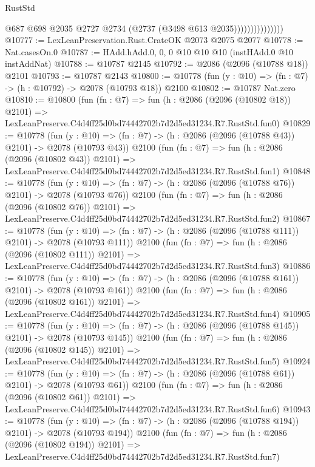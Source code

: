 \begin{lexlean}{RustStd}
\begin{coremodule}
                              @687
                              @698
                              @2035
                              @2727
                              @2734
                              (@2737 (@3498 @613 @2035)))))))))))))))
@10777 := LexLeanPreservation.Rust.CrateOK @2073 @2075 @2077
@10778 := Nat.casesOn.{0}
@10787 := HAdd.hAdd.{0, 0, 0} @10 @10 @10 (instHAdd.{0} @10 instAddNat)
@10788 := @10787 @2145
@10792 := @2086 (@2096 (@10788 @18)) @2101
@10793 := @10787 @2143
@10800 := @10778 (fun (y : @10) => (fn : @7) -> (h : @10792) -> @2078 (@10793 @18)) @2100
@10802 := @10787 Nat.zero
@10810 := @10800
    (fun (fn : @7) =>
    fun (h : @2086 (@2096 (@10802 @18)) @2101) =>
    LexLeanPreserve.C4d4ff25d0bd74442702b7d2d5ed31234.R7.RustStd.fun0)
@10829 := @10778
    (fun (y : @10) => (fn : @7) -> (h : @2086 (@2096 (@10788 @43)) @2101) -> @2078 (@10793 @43))
    @2100
    (fun (fn : @7) =>
    fun (h : @2086 (@2096 (@10802 @43)) @2101) =>
    LexLeanPreserve.C4d4ff25d0bd74442702b7d2d5ed31234.R7.RustStd.fun1)
@10848 := @10778
    (fun (y : @10) => (fn : @7) -> (h : @2086 (@2096 (@10788 @76)) @2101) -> @2078 (@10793 @76))
    @2100
    (fun (fn : @7) =>
    fun (h : @2086 (@2096 (@10802 @76)) @2101) =>
    LexLeanPreserve.C4d4ff25d0bd74442702b7d2d5ed31234.R7.RustStd.fun2)
@10867 := @10778
    (fun (y : @10) => (fn : @7) -> (h : @2086 (@2096 (@10788 @111)) @2101) -> @2078 (@10793 @111))
    @2100
    (fun (fn : @7) =>
    fun (h : @2086 (@2096 (@10802 @111)) @2101) =>
    LexLeanPreserve.C4d4ff25d0bd74442702b7d2d5ed31234.R7.RustStd.fun3)
@10886 := @10778
    (fun (y : @10) => (fn : @7) -> (h : @2086 (@2096 (@10788 @161)) @2101) -> @2078 (@10793 @161))
    @2100
    (fun (fn : @7) =>
    fun (h : @2086 (@2096 (@10802 @161)) @2101) =>
    LexLeanPreserve.C4d4ff25d0bd74442702b7d2d5ed31234.R7.RustStd.fun4)
@10905 := @10778
    (fun (y : @10) => (fn : @7) -> (h : @2086 (@2096 (@10788 @145)) @2101) -> @2078 (@10793 @145))
    @2100
    (fun (fn : @7) =>
    fun (h : @2086 (@2096 (@10802 @145)) @2101) =>
    LexLeanPreserve.C4d4ff25d0bd74442702b7d2d5ed31234.R7.RustStd.fun5)
@10924 := @10778
    (fun (y : @10) => (fn : @7) -> (h : @2086 (@2096 (@10788 @61)) @2101) -> @2078 (@10793 @61))
    @2100
    (fun (fn : @7) =>
    fun (h : @2086 (@2096 (@10802 @61)) @2101) =>
    LexLeanPreserve.C4d4ff25d0bd74442702b7d2d5ed31234.R7.RustStd.fun6)
@10943 := @10778
    (fun (y : @10) => (fn : @7) -> (h : @2086 (@2096 (@10788 @194)) @2101) -> @2078 (@10793 @194))
    @2100
    (fun (fn : @7) =>
    fun (h : @2086 (@2096 (@10802 @194)) @2101) =>
    LexLeanPreserve.C4d4ff25d0bd74442702b7d2d5ed31234.R7.RustStd.fun7)

\end{coremodule}
\end{lexlean}
